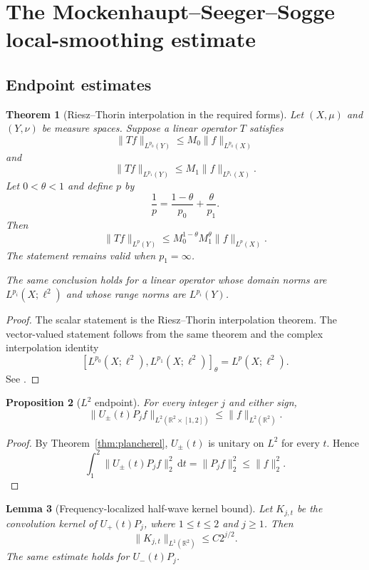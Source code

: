 \documentclass[11pt]{article}
\numberwithin{equation}{section}
\newtheorem{theorem}{Theorem}[section]
\newtheorem{proposition}[theorem]{Proposition}
\newtheorem{lemma}[theorem]{Lemma}
\theoremstyle{definition}
\theoremstyle{remark}
\newcommand{\R}{\mathbb R}
\newcommand{\dd}{\,\mathrm d}
\begin{document}
\section{The Mockenhaupt--Seeger--Sogge local-smoothing estimate}\label{sec:mss}

\subsection{Endpoint estimates}

\begin{theorem}[Riesz--Thorin interpolation in the required forms]\label{thm:riesz-thorin}
Let $(X,\mu)$ and $(Y,\nu)$ be measure spaces.  Suppose a linear operator $T$ satisfies
\[
\|Tf\|_{L^{p_0}(Y)}\le M_0\|f\|_{L^{p_0}(X)}
\]
and
\[
\|Tf\|_{L^{p_1}(Y)}\le M_1\|f\|_{L^{p_1}(X)}.
\]
Let $0<\theta<1$ and define $p$ by
\[
\frac1p=\frac{1-\theta}{p_0}+\frac\theta{p_1}.
\]
Then
\[
\|Tf\|_{L^p(Y)}\le M_0^{1-\theta}M_1^\theta\|f\|_{L^p(X)}.
\]
The statement remains valid when $p_1=\infty$.

The same conclusion holds for a linear operator whose domain norms are $L^{p_i}(X;\ell^2)$ and whose range norms are $L^{p_i}(Y)$.
\end{theorem}

\begin{proof}
The scalar statement is the Riesz--Thorin interpolation theorem.  The vector-valued statement follows from the same theorem and the complex interpolation identity
\[
[L^{p_0}(X;\ell^2),L^{p_1}(X;\ell^2)]_\theta=L^p(X;\ell^2).
\]
See \cite[Chapters~4 and~5]{BerghLofstrom1976}.
\end{proof}

\begin{proposition}[$L^2$ endpoint]\label{prop:mss-l2-endpoint}
For every integer $j$ and either sign,
\[
\|U_\pm(t)P_jf\|_{L^2(\R^2\times[1,2])}\le\|f\|_{L^2(\R^2)}.
\]
\end{proposition}

\begin{proof}
By Theorem~\ref{thm:plancherel}, $U_\pm(t)$ is unitary on $L^2$ for every $t$.  Hence
\[
\int_1^2\|U_\pm(t)P_jf\|_2^2\dd t=\|P_jf\|_2^2\le\|f\|_2^2.
\]
\end{proof}

\begin{lemma}[Frequency-localized half-wave kernel bound]\label{lem:wave-kernel-l1}
Let $K_{j,t}$ be the convolution kernel of $U_+(t)P_j$, where $1\le t\le2$ and $j\ge1$.  Then
\[
\|K_{j,t}\|_{L^1(\R^2)}\le C2^{j/2}.
\]
The same estimate holds for $U_-(t)P_j$.
\end{lemma}
\end{document}
